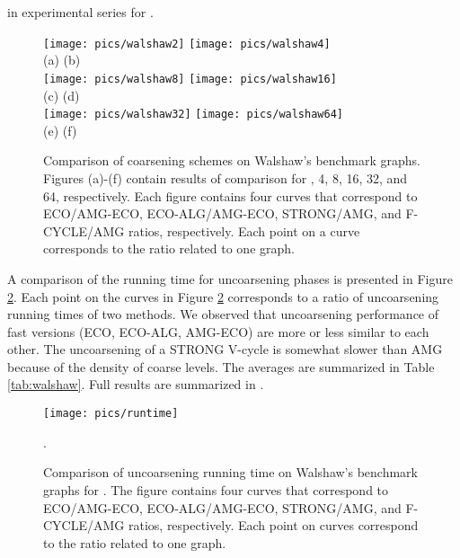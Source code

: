 \documentclass{llncs}
\begin{document}
in experimental series for .
\begin{figure}
\texttt{[image: pics/walshaw2]}  \hspace{-1cm} 
\texttt{[image: pics/walshaw4]}\\
 \hspace{3cm} (a)  \hspace{5.5cm} (b)  \\
\texttt{[image: pics/walshaw8]}  \hspace{-1cm}
\texttt{[image: pics/walshaw16]}\\
 \hspace{3cm} (c)  \hspace{5.5cm} (d)  \\
\texttt{[image: pics/walshaw32]}  \hspace{-1cm}
\texttt{[image: pics/walshaw64]}\\
 \hspace{3cm} (e)  \hspace{5.5cm} (f)  \\
\caption{Comparison of coarsening schemes on Walshaw's benchmark graphs. Figures (a)-(f) contain results of comparison for , 4, 8, 16, 32, and 64, respectively. Each figure contains four curves that correspond to ECO/AMG-ECO, ECO-ALG/AMG-ECO, STRONG/AMG, and F-CYCLE/AMG ratios, respectively. Each point on a curve corresponds to the ratio related to one graph.}\label{fig:walshaw} 
\end{figure}
A comparison of the running time for uncoarsening phases is presented in Figure \ref{fig:runtimewalshaw}. Each point on the curves in Figure \ref{fig:runtimewalshaw} corresponds to a ratio of uncoarsening running times of two methods. We observed that uncoarsening performance of fast versions (ECO, ECO-ALG, AMG-ECO) are more or less similar to each other. The uncoarsening of a STRONG V-cycle is somewhat slower than AMG because of the density of coarse levels. 
The averages are summarized in Table \ref{tab:walshaw}. Full results are summarized in \cite{hardpart-site}.
\begin{figure}
\centering
\texttt{[image: pics/runtime]}
\caption{Comparison of uncoarsening running time on Walshaw's benchmark graphs for . The figure contains four curves that correspond to ECO/AMG-ECO, ECO-ALG/AMG-ECO, STRONG/AMG, and F-CYCLE/AMG ratios, respectively. Each point on curves correspond to the ratio related to one graph.}\label{fig:runtimewalshaw}. 
\vspace*{-.5cm}
\end{figure}
\end{document}
